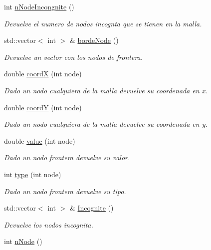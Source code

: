 \begin{DoxyCompactItemize}
int \hyperlink{class_mesh_a53a4d94cd56d2cb6439519645269d380}{n\+Node\+Incongnite} ()
\begin{DoxyCompactList}\small\item\em Devuelve el numero de nodos incognta que se tienen en la malla. \end{DoxyCompactList}\item 
std\+::vector$<$ int $>$ \& \hyperlink{class_mesh_a7860c41775b643917ea5e8d763ba0505}{borde\+Node} ()
\begin{DoxyCompactList}\small\item\em Devuelve un vector con los nodos de frontera. \end{DoxyCompactList}\item 
double \hyperlink{class_mesh_a7fcfd56c6f730879f51ff07153091f91}{coordX} (int node)
\begin{DoxyCompactList}\small\item\em Dado un nodo cualquiera de la malla devuelve su coordenada en x. \end{DoxyCompactList}\item 
double \hyperlink{class_mesh_af4f621b62849423e299f681acb4e253c}{coordY} (int node)
\begin{DoxyCompactList}\small\item\em Dado un nodo cualquiera de la malla devuelve su coordenada en y. \end{DoxyCompactList}\item 
double \hyperlink{class_mesh_adef108df36f29f4880a9233075e04210}{value} (int node)
\begin{DoxyCompactList}\small\item\em Dado un nodo frontera devuelve su valor. \end{DoxyCompactList}\item 
int \hyperlink{class_mesh_aef283d305e17ab48771999e7835ed294}{type} (int node)
\begin{DoxyCompactList}\small\item\em Dado un nodo frontera devuelve su tipo. \end{DoxyCompactList}\item 
std\+::vector$<$ int $>$ \& \hyperlink{class_mesh_add85351d5f09484fa3b4dd43d1043ae9}{Incognite} ()
\begin{DoxyCompactList}\small\item\em Devuelve los nodos incognita. \end{DoxyCompactList}\item 
int \hyperlink{class_mesh_abc68a06825b9554803c18248501338c7}{n\+Node} ()

\end{DoxyCompactItemize}
